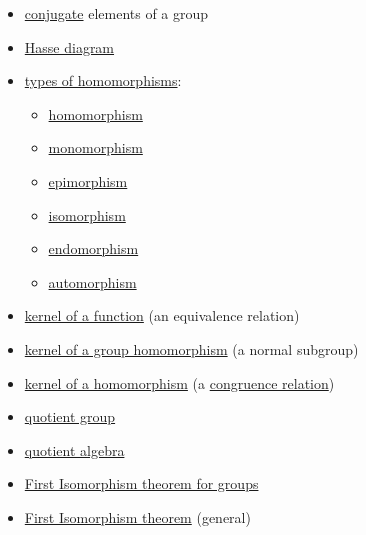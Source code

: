 \documentclass[12pt]{article}
\newcommand{\boldemph}[1]{#1}
\newcommand{\defn}[1]{#1}
\newcommand\<{\ensuremath{\langle}}
\renewcommand\>{\ensuremath{\rangle}}
\begin{document}
\begin{itemize}
\item \href{http://en.wikipedia.org/wiki/Conjugacy_class#Definition}{\boldemph{conjugate}} 
elements of a group
\item \href{http://en.wikipedia.org/wiki/Hasse_diagram}{\defn{Hasse diagram}}
\item \href{http://en.wikipedia.org/wiki/Homomorphism#Specific_kinds_of_homomorphisms}{types of homomorphisms}: 
  \begin{itemize}
  \item \href{http://en.wikipedia.org/wiki/Homomorphism#Definition}{\defn{homomorphism}}
  \item \href{http://en.wikipedia.org/wiki/Monomorphism}{\defn{monomorphism}}
  \item \href{http://en.wikipedia.org/wiki/Epimorphism}{\defn{epimorphism}}
  \item \href{http://en.wikipedia.org/wiki/Isomorphism}{\defn{isomorphism}}
  \item \href{http://en.wikipedia.org/wiki/Endomorphism}{\defn{endomorphism}}
  \item \href{http://en.wikipedia.org/wiki/Automorphism}{\defn{automorphism}}
  \end{itemize}
\item \href{http://en.wikipedia.org/wiki/Kernel_(set_theory)}{\defn{kernel} of a function} 
(an equivalence relation)
\item \href{http://en.wikipedia.org/wiki/Kernel_(algebra)#Group_homomorphisms}{\defn{kernel} 
of a group homomorphism} (a normal subgroup)
\item \href{http://en.wikipedia.org/wiki/Kernel_(algebra)#Universal_algebra}{kernel of a homomorphism} 
(a \href{http://en.wikipedia.org/wiki/Congruence_relation}{congruence relation})
\item \href{http://en.wikipedia.org/wiki/Quotient_group}{quotient group}
\item \href{http://en.wikipedia.org/wiki/Quotient_algebra}{\defn{quotient algebra}} 
\item \href{http://en.wikipedia.org/wiki/Isomorphism_theorem#Groups}{First Isomorphism theorem for groups}
\item \href{http://en.wikipedia.org/wiki/Isomorphism_theorem#General}{First Isomorphism theorem} (general)
\end{itemize}
\end{document}
